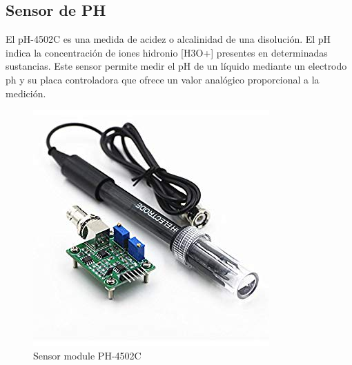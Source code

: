 \documentclass[10pt,a4paper]{article}
\begin{document}
\begin{multicols}{2}
\subsection{Sensor de PH}
El pH-4502C es una medida de acidez o alcalinidad de una disolución. El pH indica la concentración de iones hidronio [H3O+] presentes en determinadas sustancias. Este sensor permite medir el pH de un líquido mediante un electrodo ph y su placa controladora que ofrece un valor analógico proporcional a la medición.

\begin{figure}[H]
\centering
\includegraphics[scale=0.4]{ph1.jpg}
\caption{ Sensor module PH-4502C  }
\end{figure}


\end{multicols}
\end{document}
